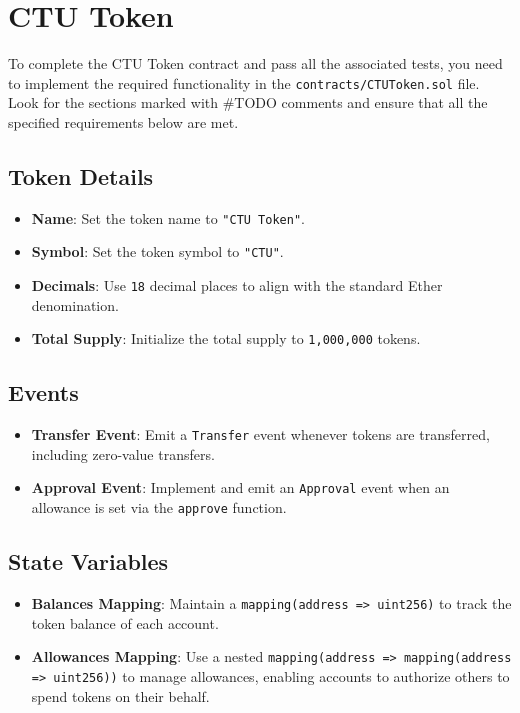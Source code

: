 \documentclass[12pt]{article}
\begin{document}
\section{CTU Token}

To complete the CTU Token contract and pass all the associated tests, you need to implement the required functionality in the \texttt{contracts/CTUToken.sol} file. Look for the sections marked with \#TODO comments and ensure that all the specified requirements below are met.

\subsection*{Token Details}
\begin{itemize}
    \item \textbf{Name}: Set the token name to \texttt{"CTU Token"}.
    \item \textbf{Symbol}: Set the token symbol to \texttt{"CTU"}.
    \item \textbf{Decimals}: Use \texttt{18} decimal places to align with the standard Ether denomination.
    \item \textbf{Total Supply}: Initialize the total supply to \texttt{1,000,000} tokens.
\end{itemize}

\subsection*{Events}
\begin{itemize}
    \item \textbf{Transfer Event}: Emit a \texttt{Transfer} event whenever tokens are transferred, including zero-value transfers.
    \item \textbf{Approval Event}: Implement and emit an \texttt{Approval} event when an allowance is set via the \texttt{approve} function.
\end{itemize}

\subsection*{State Variables}
\begin{itemize}
    \item \textbf{Balances Mapping}: Maintain a \texttt{mapping(address => uint256)} to track the token balance of each account.
    \item \textbf{Allowances Mapping}: Use a nested \texttt{mapping(address => mapping(address => uint256))} to manage allowances, enabling accounts to authorize others to spend tokens on their behalf.
\end{itemize}
\end{document}
